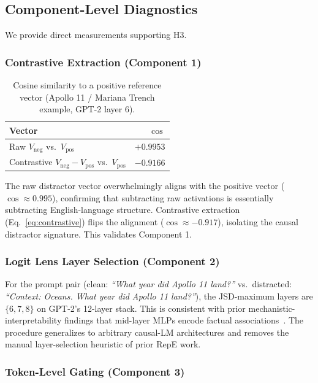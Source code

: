 \documentclass[conference]{IEEEtran}
\begin{document}
\subsection{Component-Level Diagnostics}\label{sec:results-components}

We provide direct measurements supporting H3.

\subsubsection{Contrastive Extraction (Component 1)}

\begin{table}[htbp]
\caption{Cosine similarity to a positive reference vector (Apollo 11 / Mariana Trench example, GPT-2 layer 6).}
\centering
\begin{tabular}{lr}
\toprule
\textbf{Vector} & \textbf{$\cos$} \\
\midrule
Raw $V_{\text{neg}}$ vs.\ $V_{\text{pos}}$         & $+0.9953$ \\
Contrastive $V_{\text{neg}}-V_{\text{pos}}$ vs.\ $V_{\text{pos}}$ & $-0.9166$ \\
\bottomrule
\end{tabular}
\label{tab:contrastive}
\end{table}

The raw distractor vector overwhelmingly aligns with the positive vector ($\cos \approx 0.995$), confirming that subtracting raw activations is essentially subtracting English-language structure. Contrastive extraction (Eq.~\ref{eq:contrastive}) flips the alignment ($\cos \approx -0.917$), isolating the causal distractor signature. This validates Component 1.

\subsubsection{Logit Lens Layer Selection (Component 2)}

For the prompt pair (clean: \emph{``What year did Apollo 11 land?''} vs.\ distracted: \emph{``Context: Oceans. What year did Apollo 11 land?''}), the JSD-maximum layers are $\{6, 7, 8\}$ on GPT-2's 12-layer stack. This is consistent with prior mechanistic-interpretability findings that mid-layer MLPs encode factual associations~\cite{meng2022rome}. The procedure generalizes to arbitrary causal-LM architectures and removes the manual layer-selection heuristic of prior RepE work.

\subsubsection{Token-Level Gating (Component 3)}
\end{document}
